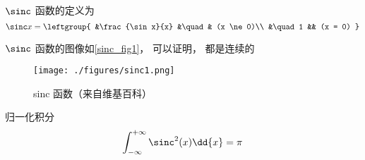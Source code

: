 
$\sinc$ 函数的定义为
\begin{equation}
\sinc x = 
\leftgroup{
&\frac{\sin x}{x} &\quad & (x \ne 0)\\
&\quad 1 && (x = 0)
}\end{equation}

$\sinc$ 函数的图像如\autoref{sinc_fig1}， 可以证明， 都是连续的

\begin{figure}[ht]
\centering
\texttt{[image: ./figures/sinc1.png]}
\caption{sinc 函数（来自维基百科）} \label{sinc_fig1}
\end{figure}


归一化积分
\begin{equation}
\int_{-\infty}^{+\infty} \sinc^2(x) \dd{x} = \pi
\end{equation}
